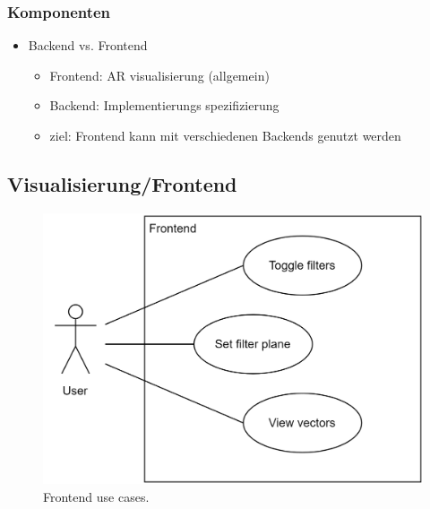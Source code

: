\subsubsection{Komponenten}

\begin{itemize}
	\item Backend vs. Frontend
	\begin{itemize}
		\item Frontend: AR visualisierung (allgemein)
		\item Backend: Implementierungs spezifizierung
		\item ziel: Frontend kann mit verschiedenen Backends genutzt werden
	\end{itemize}
\end{itemize}


\subsection{Visualisierung/Frontend}

\begin{figure}
	\centering
	\includegraphics[width=.75\linewidth]{images/frontend/UseCases}
	\caption{Frontend use cases.}
	\label{fig:frontendUseCase}
\end{figure}

